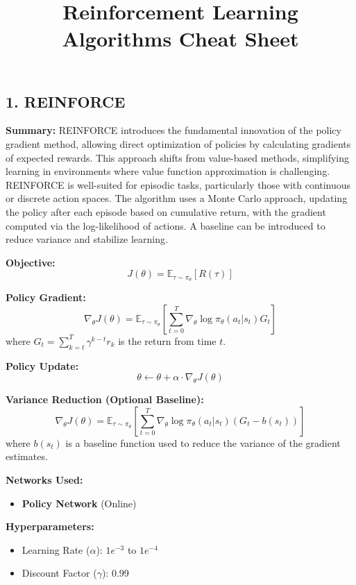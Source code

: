 \documentclass[a4paper,10pt]{article}
\title{\vspace{-4cm}Reinforcement Learning Algorithms Cheat Sheet}
\author{}
\date{}
\begin{document}
\maketitle
\footnotesize
\begin{multicols}{2}

\section*{1. REINFORCE}
\textbf{Summary:} REINFORCE introduces the fundamental innovation of the policy gradient method, allowing direct optimization of policies by calculating gradients of expected rewards. This approach shifts from value-based methods, simplifying learning in environments where value function approximation is challenging. REINFORCE is well-suited for episodic tasks, particularly those with continuous or discrete action spaces. The algorithm uses a Monte Carlo approach, updating the policy after each episode based on cumulative return, with the gradient computed via the log-likelihood of actions. A baseline can be introduced to reduce variance and stabilize learning.

\textbf{Objective:}
\[
J(\theta) = \mathbb{E}_{\tau \sim \pi_\theta} \left[ R(\tau) \right]
\]

\textbf{Policy Gradient:}
\[
\nabla_\theta J(\theta) = \mathbb{E}_{\tau \sim \pi_\theta} \left[ \sum_{t=0}^{T} \nabla_\theta \log \pi_\theta(a_t | s_t) G_t \right]
\]
where \( G_t = \sum_{k=t}^{T} \gamma^{k-t} r_k \) is the return from time \( t \).

\textbf{Policy Update:}
\[
\theta \leftarrow \theta + \alpha \cdot \nabla_\theta J(\theta)
\]

\textbf{Variance Reduction (Optional Baseline):}
\[
\nabla_\theta J(\theta) = \mathbb{E}_{\tau \sim \pi_\theta} \left[ \sum_{t=0}^{T} \nabla_\theta \log \pi_\theta(a_t | s_t) \left( G_t - b(s_t) \right) \right]
\]
where \( b(s_t) \) is a baseline function used to reduce the variance of the gradient estimates.

\textbf{Networks Used:} 
\begin{itemize}
    \item \textbf{Policy Network} (Online)
\end{itemize}

\textbf{Hyperparameters:}
\begin{itemize}
    \item Learning Rate (\(\alpha\)): \(1e^{-3}\) to \(1e^{-4}\)
    \item Discount Factor (\(\gamma\)): 0.99
\end{itemize}


\end{multicols}
\end{document}
